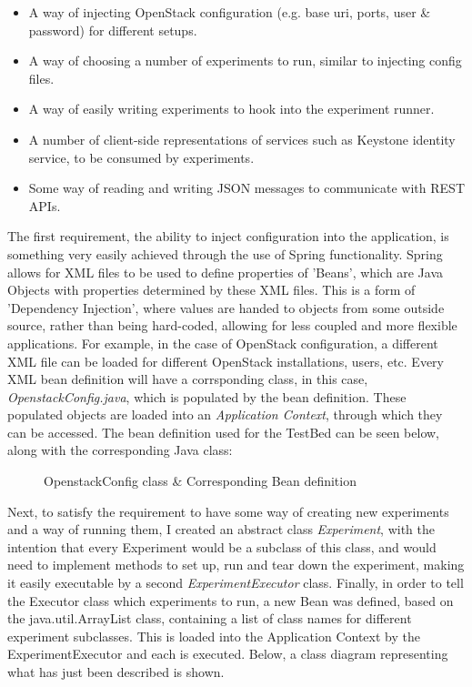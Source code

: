 \begin{itemize}
\itemsep0em
\item A way of injecting OpenStack configuration (e.g. base uri, ports, user \& password) for different setups. 
\item A way of choosing a number of experiments to run, similar to injecting config files. 
\item A way of easily writing experiments to hook into the experiment runner. 
\item A number of client-side representations of services such as Keystone identity service, to be consumed by experiments. 
\item Some way of reading and writing JSON messages to communicate with REST APIs. 
\end{itemize}

The first requirement, the ability to inject configuration into the application, is something very easily achieved through the use of Spring functionality. Spring allows for XML files to be used to define properties of 'Beans', which are Java Objects with properties determined by these XML files. This is a form of 'Dependency Injection', where values are handed to objects from some outside source, rather than being hard-coded, allowing for less coupled and more flexible applications. For example, in the case of OpenStack configuration, a different XML file can be loaded for different OpenStack installations, users, etc. Every XML bean definition will have a corrsponding class, in this case, \textit{OpenstackConfig.java}, which is populated by the bean definition. These populated objects are loaded into an \textit{Application Context}, through which they can be accessed. The bean definition used for the TestBed can be seen below, along with the corresponding Java class:

\begin{figure}[H]
\centering
{}
\caption{OpenstackConfig class \& Corresponding Bean definition} 
\end{figure}

Next, to satisfy the requirement to have some way of creating new experiments and a way of running them, I created an abstract class \textit{Experiment}, with the intention that every Experiment would be a subclass of this class, and would need to implement methods to set up, run and tear down the experiment, making it easily executable by a second \textit{ExperimentExecutor} class. Finally, in order to tell the Executor class which experiments to run, a new Bean was defined, based on the java.util.ArrayList class, containing a list of class names for different experiment subclasses. This is loaded into the Application Context by the ExperimentExecutor and each is executed. Below, a class diagram representing what has just been described is shown.

